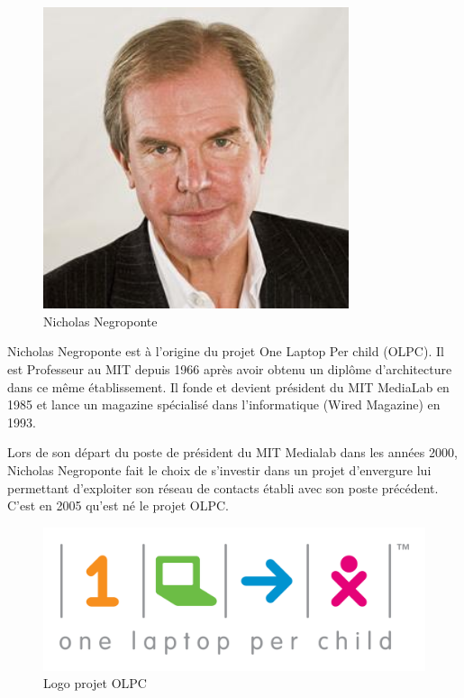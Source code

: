 \begin{minipage}[H]{0.3\linewidth}
  \begin{figure}[H]
  \centering
  \includegraphics[width=0.8\textwidth]{../resources/illustrations/nicholasnegroponte}
  \caption{\mbox{Nicholas} \mbox{Negroponte}}
  \end{figure}
\end{minipage}
\begin{minipage}[H]{0.7\linewidth}
Nicholas Negroponte est à l'origine du projet \og One Laptop Per child \fg{} (\gls{OLPC}). Il est Professeur au MIT depuis 1966 après avoir obtenu un diplôme d'architecture dans ce même établissement. Il fonde et devient président du MIT MediaLab en 1985 et lance un magazine spécialisé dans l'informatique (Wired Magazine) en 1993\cite{wikipedia_nicholas_negroponte}.
\vspace{.8cm}
\end{minipage}

Lors de son départ du poste de président du MIT Medialab dans les années 2000, Nicholas Negroponte fait le choix de s'investir dans un projet d'envergure lui permettant d'exploiter son réseau de contacts établi avec son poste précédent. C'est en 2005 qu'est né le projet \gls{OLPC}.

\begin{figure}[H]
  \centering
  \includegraphics[width=.5\textwidth]{../resources/illustrations/OLPC_logo}
  \caption{Logo projet \gls{OLPC}}
\end{figure}

